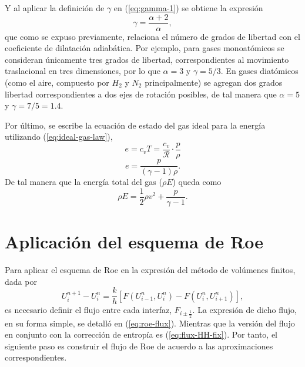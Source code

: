 Y al aplicar la definición de $\gamma$ en (\ref{eq:gamma-1}) se obtiene la expresión
\begin{equation}
	\gamma = \frac{\alpha + 2}{\alpha},
\end{equation}
que como se expuso previamente, relaciona el número de grados de libertad con el coeficiente de dilatación adiabática. Por ejemplo, para gases monoatómicos se consideran únicamente tres grados de libertad, correspondientes al movimiento traslacional en tres dimensiones, por lo que $\alpha = 3$ y $\gamma = 5/3$. En gases diatómicos (como el aire, compuesto por $H_2$ y $N_2$ principalmente) se agregan dos grados libertad correspondientes a dos ejes de rotación posibles, de tal manera que $\alpha = 5$ y $\gamma = 7/5 = 1.4$.

Por último, se escribe la ecuación de estado del gas ideal para la energía utilizando  (\ref{eq:ideal-gas-law}),
\begin{equation}
	e = c_v T = \frac{c_v}{\mathcal{R}}\cdot\frac{p}{\rho}
\end{equation}
\begin{equation}
	e = \frac{p}{(\gamma - 1) \rho}.
\end{equation}
De tal manera que la energía total del gas ($\rho E$) queda como
\begin{equation}
	 \rho E = \frac{1}{2}\rho v^{2} + \frac{p}{\gamma - 1}.
\end{equation}
\section{Aplicación del esquema de Roe}
Para aplicar el esquema de Roe en la expresión del método de volúmenes finitos, dada por 
\begin{equation}
	U_{i}^{n+1}-U_{i}^{n} = 
	\frac{k}{h}\left[ F(U_{i-1}^n, U_i^n) - F(U_{i}^n, U_{i+1}^n) \right],
	\label{eq:metodo-vol-finitos-3}
\end{equation}
 es necesario definir el flujo entre cada interfaz, $F_{i\pm \frac{1}{2}}$. La expresión de dicho flujo, en su forma simple, se detalló en (\ref{eq:roe-flux}). Mientras que la versión del flujo en conjunto con la corrección de entropía es (\ref{eq:flux-HH-fix}). Por tanto, el siguiente paso es construir el flujo de Roe de acuerdo a las aproximaciones correspondientes.
